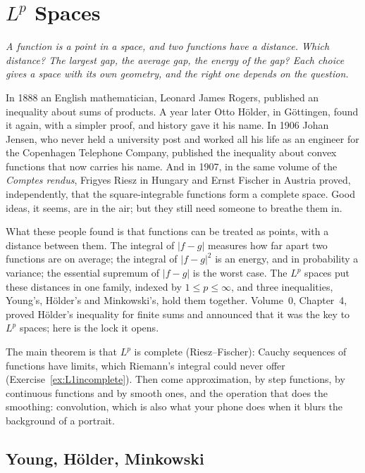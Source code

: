 \chapter{\texorpdfstring{$L^p$}{Lp} Spaces}

\begin{center}\itshape
A function is a point in a space, and two functions have a distance. Which distance? The largest gap, the average gap, the
energy of the gap? Each choice gives a space with its own geometry, and the right one depends on the question.
\end{center}

In 1888 an English mathematician, Leonard James Rogers, published an inequality about sums of products. A year later Otto
H\"older, in G\"ottingen, found it again, with a simpler proof, and history gave it his name. In 1906 Johan Jensen, who never
held a university post and worked all his life as an engineer for the Copenhagen Telephone Company, published the inequality
about convex functions that now carries his name. And in 1907, in the same volume of the \emph{Comptes rendus}, Frigyes Riesz
in Hungary and Ernst Fischer in Austria proved, independently, that the square-integrable functions form a complete space. Good
ideas, it seems, are in the air; but they still need someone to breathe them in.

What these people found is that functions can be treated as points, with a distance between them. The integral of $|f-g|$
measures how far apart two functions are on average; the integral of $|f-g|^2$ is an energy, and in probability a variance;
the essential supremum of $|f-g|$ is the worst case. The $L^p$ spaces put these distances in one family, indexed by
$1\le p\le\infty$, and three inequalities, Young's, H\"older's and Minkowski's, hold them together. Volume~0, Chapter~4, proved
H\"older's inequality for finite sums and announced that it was the key to $L^p$ spaces; here is the lock it opens.

The main theorem is that $L^p$ is complete (Riesz--Fischer): Cauchy sequences of functions have limits, which Riemann's
integral could never offer (Exercise~\ref{ex:L1incomplete}). Then come approximation, by step functions, by continuous
functions and by smooth ones, and the operation that does the smoothing: convolution, which is also what your phone does
when it blurs the background of a portrait.

\section{Young, H\"older, Minkowski}

